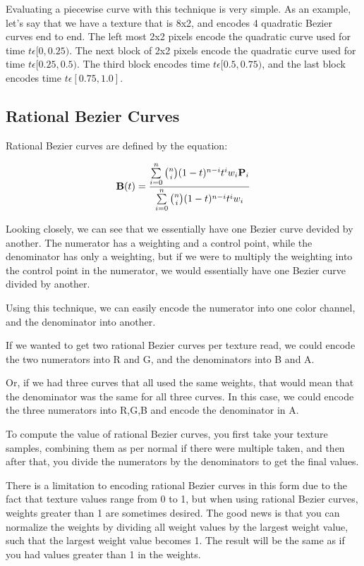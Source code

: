 \documentclass{jcgt}
\begin{document}
Evaluating a piecewise curve with this technique is very simple.  As an example, let's say that we have a texture that is 8x2, and encodes 4 quadratic Bezier curves end to end. The left most 2x2 pixels encode the quadratic curve used for time $t \epsilon [0,0.25)$.  The next block of 2x2 pixels encode the quadratic curve used for time $t \epsilon [0.25,0.5)$.  The third block encodes time $t \epsilon [0.5,0.75)$, and the last block encodes time $t \epsilon [0.75,1.0]$.

\subsection{Rational Bezier Curves}

Rational Bezier curves are defined by the equation:

\begin{equation}
\text{\bf{B}}(t) = \frac
                {\sum\limits_{i=0}^n\binom {n} {i}(1-t)^{n-i}t^iw_i\text{\bf{P}}_i}
                {\sum\limits_{i=0}^n\binom {n} {i}(1-t)^{n-i}t^iw_i}
\label{eqn:rationalbezier}                
\end{equation}

Looking closely, we can see that we essentially have one Bezier curve devided by another.  The numerator has a weighting and a control point, while the denominator has only a weighting, but if we were to multiply the weighting into the control point in the numerator, we would essentially have one Bezier curve divided by another.

Using this technique, we can easily encode the numerator into one color channel, and the denominator into another.

If we wanted to get two rational Bezier curves per texture read, we could encode the two numerators into R and G, and the denominators into B and A.

Or, if we had three curves that all used the same weights, that would mean that the denominator was the same for all three curves.  In this case, we could encode the three numerators into R,G,B and encode the denominator in A.

To compute the value of rational Bezier curves, you first take your texture samples, combining them as per normal if there were multiple taken, and then after that, you divide the numerators by the denominators to get the final values.

There is a limitation to encoding rational Bezier curves in this form due to the fact that texture values range from 0 to 1, but when using rational Bezier curves, weights greater than 1 are sometimes desired.  The good news is that you can normalize the weights by dividing all weight values by the largest weight value, such that the largest weight value becomes 1.  The result will be the same as if you had values greater than 1 in the weights.
\end{document}
